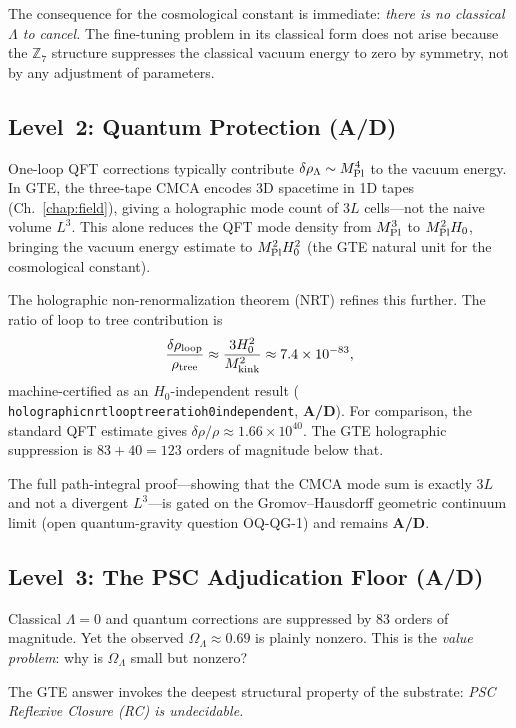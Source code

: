 \documentclass[11pt,openany]{book}
\theoremstyle{remark}
\newcommand{\ZS}{\mathbb{Z}_7}
\newcommand{\lean}[1]{%
  \penalty-100
  \begingroup\def\_{\textunderscore\allowbreak}\texttt{#1}\endgroup}
\newcommand{\OmL}{\Omega_\Lambda}
\newcommand{\CatAD}{\textbf{A/D}}
\begin{document}
The consequence for the cosmological constant is immediate:
\emph{there is no classical $\Lambda$ to cancel.}
The fine-tuning problem in its classical form does not arise because the $\ZS$
structure suppresses the classical vacuum energy to zero by symmetry, not by
any adjustment of parameters.

\subsection*{Level~2: Quantum Protection (\CatAD)}

One-loop QFT corrections typically contribute $\delta\rho_\Lambda \sim M_{\rm Pl}^4$
to the vacuum energy.
In GTE, the three-tape CMCA encodes 3D spacetime in 1D tapes (Ch.~\ref{chap:field}),
giving a holographic mode count of $3L$ cells---not the naive volume $L^3$.
This alone reduces the QFT mode density from $M_{\rm Pl}^3$ to $M_{\rm Pl}^2 H_0$,
bringing the vacuum energy estimate to $M_{\rm Pl}^2 H_0^2$ (the GTE natural unit for
the cosmological constant).

The holographic non-renormalization theorem (NRT) refines this further.
The ratio of loop to tree contribution is
\begin{equation}
  \frac{\delta\rho_{\rm loop}}{\rho_{\rm tree}}
  \approx \frac{3H_0^2}{M_{\rm kink}^2}
  \approx 7.4 \times 10^{-83},
\label{eq:nrt_ratio}
\end{equation}
machine-certified as an $H_0$-independent result
(\lean{holographic\_nrt\_loop\_tree\_ratio\_h0\_independent}, \CatAD).
For comparison, the standard QFT estimate gives $\delta\rho/\rho \approx 1.66 \times 10^{40}$.
The GTE holographic suppression is $83 + 40 = 123$ orders of magnitude below that.

The full path-integral proof---showing that the CMCA mode sum is exactly $3L$ and not
a divergent $L^3$---is gated on the Gromov--Hausdorff geometric continuum limit
(open quantum-gravity question OQ-QG-1) and remains \CatAD.

\subsection*{Level~3: The PSC Adjudication Floor (\CatAD)}

Classical $\Lambda = 0$ and quantum corrections are suppressed by 83 orders of magnitude.
Yet the observed $\OmL \approx 0.69$ is plainly nonzero.
This is the \emph{value problem}: why is $\OmL$ small but nonzero?

The GTE answer invokes the deepest structural property of the substrate:
\emph{PSC Reflexive Closure (RC) is undecidable.}
\end{document}
